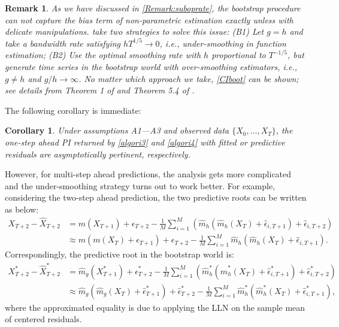 \documentclass[a4paper]{article}
\newtheorem*{Remarknn}{Remark}
\newtheorem{Corollary}{Corollary}[section]
\begin{document}
\begin{Remarknn}
As we have discussed in \cref{Remark:suboprate}, the bootstrap procedure can not capture the bias term of non-parametric estimation exactly unless with delicate manipulations. \cite{pan2016bootstrap} take two strategies to solve this issue: (B1) Let $g = h$ and take a bandwidth rate satisfying $hT^{1/5}\to 0$,  i.e., under-smoothing in function estimation; (B2) Use the optimal
smoothing rate with $h$
 proportional to $T^{-1/5}$, but generate time series in the bootstrap world with over-smoothing estimators, i.e., $g\neq h$ and $g/h\overset{}{\to}\infty$. No matter which approach we take, \cref{CIboot} can be shown; see details from Theorem 1 of \cite{franke2002bootstrap} and Theorem 5.4 of \cite{pan2016bootstrap}. 
\end{Remarknn}

The following corollary is immediate:
\begin{Corollary}\label{Corollary:1steppertinent}
Under assumptions A1---A3 and observed data $\{X_0,\ldots,X_T\}$, the one-step ahead PI returned by \cref{algori3} and \cref{algori4} with fitted or predictive residuals are asymptotically pertinent, respectively. 
\end{Corollary}

However, for multi-step ahead predictions, the analysis gets more complicated and the under-smoothing strategy turns out to work better. For example, considering the two-step ahead prediction, the two predictive roots can be written as below:
\begin{equation}\label{pretoot2stepreal}
\begin{split}
    X_{T+2} - \widehat{X}_{T+2} &= m(X_{T+1}) + \epsilon_{T+2} - \frac{1}{M}\sum_{i=1}^{M}\left(  \widehat{m}_{h}\left(\widehat{m}_{h}(X_T)+\hat{\epsilon}_{i,T+1}\right)+\hat{\epsilon}_{i,T+2}
 \right) \\
  &\approx m(m(X_T)+\epsilon_{T+1}) + \epsilon_{T+2} - \frac{1}{M}\sum_{i=1}^{M} \widehat{m}_{h}\left(\widehat{m}_{h}(X_T)+\hat{\epsilon}_{i,T+1}\right) .
\end{split}
\end{equation}
Correspondingly, the predictive root in the bootstrap world is:
\begin{equation}\label{pretoot2stepboot}
\begin{split}
    X^*_{T+2} - \widehat{X}^*_{T+2} &= \widehat{m}_{g}(X^*_{T+1}) + \hat{\epsilon}^*_{T+2} - \frac{1}{M}\sum_{i=1}^{M}\left(  \widehat{m}^*_{h}\left(\widehat{m}^*_{h}(X_T)+\hat{\epsilon}^*_{i,T+1}\right)+\hat{\epsilon}^*_{i,T+2}
 \right) \\
  &\approx \widehat{m}_{g}(\widehat{m}_{g}(X_T)+\hat{\epsilon}^*_{T+1}) + \hat{\epsilon}^*_{T+2} - \frac{1}{M}\sum_{i=1}^{M}  \widehat{m}^*_{h}\left(\widehat{m}^*_{h}(X_T)+\hat{\epsilon}^*_{i,T+1}\right),
\end{split}
\end{equation}
where the approximated equality is due to applying the LLN on the sample mean of centered residuals. 
\end{document}
